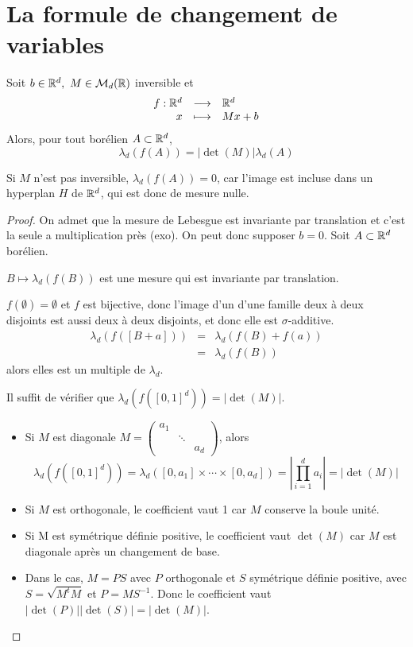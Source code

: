 
\section{La formule de changement de variables}


\begin{prop}
	Soit $b \in \mathbb{R}^d, \ M \in \mathcal{M}_d(\mathbb{R})$ inversible et
	$$ \begin{array}{rcl}
			f : \mathbb{R}^d & \longrightarrow & \mathbb{R}^d   \\
			x        & \longmapsto     & Mx + b
		\end{array} $$
	Alors, pour tout borélien $A \subset \mathbb{R}^d$,
	$$ \lambda_d(f(A)) = |\det(M)| \lambda_d(A) $$
\end{prop}

\begin{remarque}
	Si $M$ n'est pas inversible, $\lambda_d(f(A)) = 0$, car l'image est incluse dans un hyperplan $H$
	de $\mathbb{R}^d$, qui est donc de mesure nulle.
\end{remarque}

\begin{proof}
	On admet que la mesure de Lebesgue est invariante par translation et c'est la seule a multiplication près (exo). On peut donc supposer
	$b = 0$. Soit $A \subset \mathbb{R}^d$ borélien.

	$B \mapsto \lambda_d(f(B))$ est une mesure qui est invariante par translation.

	$f (\emptyset) = \emptyset$ et $f$ est bijective, donc l'image d'un d'une famille deux à deux disjoints est aussi deux à deux disjoints, et donc elle est
	$\sigma$-additive.
	\begin{eqnarray*}
		\lambda_d(f([B+a])) &=& \lambda_d(f(B) + f(a)) \\
		&=& \lambda_d(f(B))
	\end{eqnarray*}
	alors elles est un multiple de $\lambda_d$.

	Il suffit de vérifier que $\lambda_d(f([0,1]^d)) = |\det(M)|$.

	\begin{itemize}
		\item Si $M$ est diagonale $M = \begin{pmatrix} a_1 & & \\ & \ddots & \\ & & a_d \end{pmatrix}$, alors
		      $$ \lambda_d(f([0,1]^d)) = \lambda_d([0, a_1] \times \cdots \times [0, a_d]) =\left| \prod_{i=1}^d a_i \right|= |\det(M)| $$
		\item Si $M$ est orthogonale, le coefficient vaut 1 car $M$ conserve la boule unité.
		\item Si M est symétrique définie positive, le coefficient vaut $\det(M)$ car $M$ est diagonale après un changement de base.
		\item Dans le cas, $M = PS$ avec $P$ orthogonale et $S$ symétrique définie positive, avec $S =\sqrt{M^tM}$ et $P = M S^{-1}$.
		      Donc le coefficient vaut $|\det(P)| |\det(S)| = |\det(M)|$.
	\end{itemize}
\end{proof}


